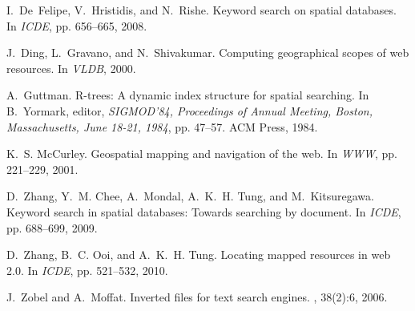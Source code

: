 \documentclass{sig-alternate}
\begin{document}
\begin{thebibliography}{10}
\begin{small}
I.~De~Felipe, V.~Hristidis, and N.~Rishe.
\newblock Keyword search on spatial databases.
\newblock In {\em ICDE}, pp. 656--665, 2008.

J.~Ding, L.~Gravano, and N.~Shivakumar.
\newblock Computing geographical scopes of web resources.
\newblock In {\em VLDB}, 2000.

A.~Guttman.
\newblock R-trees: A dynamic index structure for spatial searching.
\newblock In B.~Yormark, editor, {\em SIGMOD'84, Proceedings of Annual Meeting,
  Boston, Massachusetts, June 18-21, 1984}, pp. 47--57. ACM Press, 1984.

K.~S. McCurley.
\newblock Geospatial mapping and navigation of the web.
\newblock In {\em WWW}, pp. 221--229, 2001.

D.~Zhang, Y.~M. Chee, A.~Mondal, A.~K.~H. Tung, and M.~Kitsuregawa.
\newblock Keyword search in spatial databases: Towards searching by document.
\newblock In {\em ICDE}, pp. 688--699, 2009.

D.~Zhang, B.~C. Ooi, and A.~K.~H. Tung.
\newblock Locating mapped resources in web 2.0.
\newblock In {\em ICDE}, pp. 521--532, 2010.

J.~Zobel and A.~Moffat.
\newblock Inverted files for text search engines.
, 38(2):6, 2006.
\end{small}

\end{thebibliography}
\end{document}
